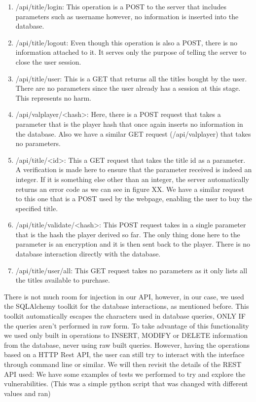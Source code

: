 \documentclass[11pt,a4paper]{report}
\begin{document}
\begin{enumerate}
 \item /api/title/login: This operation is a POST to the server that includes parameters such as username however, no information is inserted into the database.
 \item /api/title/logout: Even though this operation is also a POST, there is no information attached to it. It serves only the purpose of telling the server to close the user session.
 \item /api/title/user: This is a GET that returns all the titles bought by the user. There are no parameters since the user already has a session at this stage. This represents no harm.
 \item /api/valplayer/<hash>: Here, there is a POST request that takes a parameter that is the player hash that once again inserts no information in the database. Also we have a similar GET request (/api/valplayer) that takes no parameters.
 \item /api/title/<id>: This a GET request that takes the title id as a parameter. A verification is made here to ensure that the parameter received is indeed an integer. If it is something else other than an integer, the server automatically returns an error code as we can see in figure XX. We have a similar request to this one that is a POST used by the webpage, enabling the user to buy the specified title.
 \item /api/title/validate/<hash>: This POST request takes in a single parameter that is the hash the player derived so far. The only thing done here to the parameter is an encryption and it is then sent back to the player. There is no database interaction directly with the database.
 \item /api/title/user/all: This GET request takes no parameters as it only lists all the titles available to purchase.
\end{enumerate}

There is not much room for injection in our API, however, in our case, we used the SQLAlchemy toolkit for the database interactions, as mentioned before. This toolkit automatically escapes the characters used in database queries, ONLY IF the queries aren’t performed in raw form. To take advantage of this functionality we used only built in operations to INSERT, MODIFY or DELETE information from the database, never using raw built queries.
\newline
However, having the operations based on a HTTP Rest API, the user can still try to interact with the interface through command line or similar. We will then revisit the details of the REST API used:
We have some examples of tests we performed to try and explore the vulnerabilities. (This was a simple python script that was changed with different values and ran)
\end{document}
